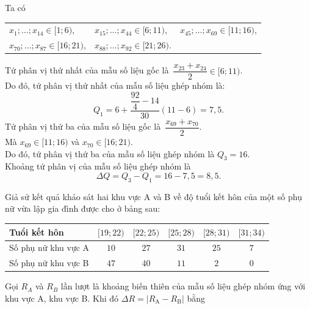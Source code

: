 \begin{bt}
{		Ta có
		\begin{center}
			\begin{tabular}{lll}
				$x_1;\ldots;x_{14}\in  [1; 6)$,&
				$x_{15};\ldots;x_{44}\in  [6; 11)$,&
				$x_{45};\ldots;x_{69}\in  [11; 16)$,\\
				$x_{70};\ldots;x_{87}\in  [16; 21)$,&
				$x_{88};\ldots;x_{92}\in  [21; 26)$.&
			\end{tabular}
		\end{center}
		Tứ phân vị thứ nhất của mẫu số liệu gốc là $\dfrac{x_{23}+x_{24}}{2}\in [6; 11)$. \\
		Do đó, tứ phân vị thứ nhất của mẫu số liệu ghép nhóm là:
		$$Q_1=6+\dfrac{\dfrac{92}{4}-14}{30}\left(11-6\right)=7{,}5.$$
		Tứ phân vị thứ ba của mẫu số liệu gốc là $\dfrac{x_{69}+x_{70}}{2}$.\\
		Mà $x_{69}\in [11; 16)$ và $x_{70}\in [16; 21)$. \\
		Do đó, tứ phân vị thứ ba của mẫu số liệu ghép nhóm là $Q_3 = 16$.\\
		Khoảng tứ phân vị của mẫu số liệu ghép nhóm là
		$$\Delta Q = Q_3 - Q_1 = 16 - 7{,}5 = 8{,}5.$$
	}
\end{bt}

\begin{bt}%

	Giả sử kết quả khảo sát hai khu vực A và B về độ tuổi kết hôn của một số phụ nữ vừa lập gia đình được cho ở bảng sau:
	\begin{center}
		\begin{tabular}{|l|c|c|c|c|c|}
			\hline
			Tuổi kết hôn & $[19; 22)$ & $[22; 25)$ & $[25; 28)$ & $[28; 31)$ & $[31; 34)$ \\
			\hline
			Số phụ nữ khu vực A & $10$ & $27$ & $31$ & $25$ & $7$ \\
			\hline
			Số phụ nữ khu vực B & $47$ & $40$ & $11$ & $2$ & $0$ \\
			\hline
		\end{tabular}
	\end{center}
Gọi $R_A$ và $R_B$ lần lượt là khoảng biến thiên của mẫu số liệu ghép nhóm ứng với khu vực A, khu vực B. Khi đó $\Delta R=|R_\text{A}-R_\text{B}|$ bằng
\end{bt}

